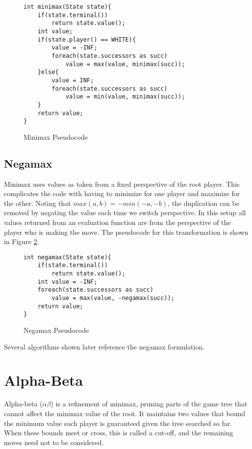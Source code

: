 \begin{figure}

\begin{lstlisting}
int minimax(State state){
	if(state.terminal())
		return state.value();
	int value;
	if(state.player() == WHITE){
		value = -INF;
		foreach(state.successors as succ)
			value = max(value, minimax(succ));
	}else{
		value = INF;
		foreach(state.successors as succ)
			value = min(value, minimax(succ));
	}
	return value;
}
\end{lstlisting}

\caption{Minimax Pseudocode}
\label{fig:minimaxcode}

\end{figure}


\subsection{Negamax}

Minimax uses values as taken from a fixed perspective of the root player. This complicates the code with having to minimize for one player and maximize for the other. Noting that $max(a,b) = -min(-a,-b)$, the duplication can be removed by negating the value each time we switch perspective. In this setup all values returned from an evaluation function are from the perspective of the player who is making the move. The pseudocode for this transformation is shown in Figure \ref{fig:negamaxcode}.

\begin{figure}

\begin{lstlisting}
int negamax(State state){
	if(state.terminal())
		return state.value();
	int value = -INF;
	foreach(state.successors as succ)
		value = max(value, -negamax(succ));
	return value;
}
\end{lstlisting}

\caption{Negamax Pseudocode}
\label{fig:negamaxcode}
\end{figure}

Several algorithms shown later reference the negamax formulation.


\section{Alpha-Beta}\label{sec:alphabeta}

Alpha-beta ($\alpha\beta$) is a refinement of minimax, pruning parts of the game tree that cannot affect the minimax value of the root\cite{knuth1975alphabeta}. It maintains two values that bound the minimum value each player is guaranteed given the tree searched so far. When these bounds meet or cross, this is called a cut-off, and the remaining moves need not to be considered.

